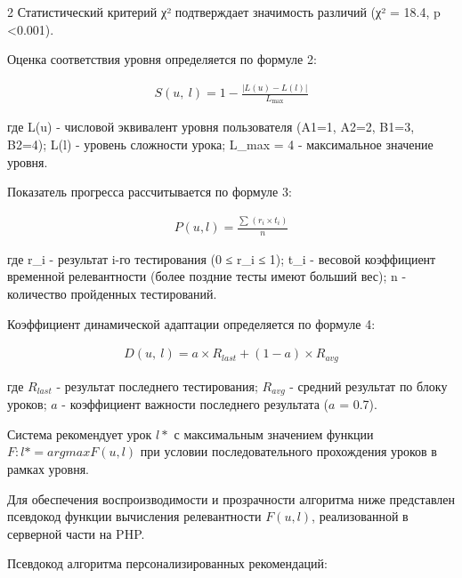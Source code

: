\begin{multicols}{2}
Статистический критерий χ² подтверждает значимость различий (χ² = 18.4,
p <0.001).

Оценка соответствия уровня определяется по формуле 2:

\begin{equation}
\begin{array}{r}
S(u,\ l) = 1 - \frac{\left| L(u) - L(l) \right|}{L_{\max}}
\end{array}
\end{equation}

где L(u) - числовой эквивалент уровня пользователя (A1=1, A2=2, B1=3,
B2=4); L(l) - уровень сложности урока; L\_max = 4 - максимальное
значение уровня.

Показатель прогресса рассчитывается по формуле 3:

\begin{equation}
\begin{array}{r}
P(u,l) = \frac{\sum_{}^{}{(r_{i} \times t_{i})}}{n}
\end{array}
\end{equation}

где r\_i - результат i-го тестирования (0 ≤ r\_i ≤ 1); t\_i - весовой
коэффициент временной релевантности (более поздние тесты имеют больший
вес); n - количество пройденных тестирований.

Коэффициент динамической адаптации определяется по формуле 4:

\begin{equation}
\begin{array}{r}
D(u,\ l) = a \times R_{last} + (1 - a) \times R_{avg}
\end{array}
\end{equation}

где \(R_{last}\) - результат последнего тестирования; \(R_{avg}\) - средний
результат по блоку уроков; \(a\) - коэффициент важности последнего
результата (\(a\) = 0.7).

Система рекомендует урок \(l*\) с максимальным значением функции \(F: l* =
argmax F(u, l)\) при условии последовательного прохождения уроков в рамках
уровня.

Для обеспечения воспроизводимости и прозрачности алгоритма ниже
представлен псевдокод функции вычисления релевантности \(F(u,l)\),
реализованной в серверной части на PHP.

Псевдокод алгоритма персонализированных рекомендаций:
\end{multicols}

